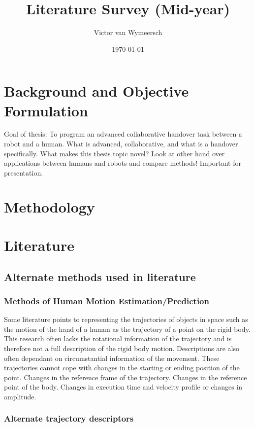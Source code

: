 \documentclass{article}
\title{Literature Survey (Mid-year)}
\author{Victor van Wymeersch}
\date{\today}
\begin{document}
\maketitle

 
\section{Background and Objective Formulation}
Goal of thesis: To program an advanced collaborative handover task between a robot and a human. 
What is advanced, collaborative, and what is a handover specifically. 
What makes this thesis topic novel? Look at other hand over applications between humans and robots and compare methods! Important for presentation.

\section{Methodology}
\section{Literature}

\subsection{Alternate methods used in literature}
\subsubsection{Methods of Human Motion Estimation/Prediction}
Some literature points to representing the trajectories of objects in space such as the motion of the hand of a human as the trajectory of a point on the rigid body. 
This research often lacks the rotational information of the trajectory and is therefore not a full description of the rigid body motion.
Descriptions are also often dependant on circumstantial information of the movement. These trajectories cannot cope with changes in the starting or ending position of the point. Changes in the reference frame of the trajectory. Changes in the reference point of the body. Changes in execution time and velocity profile or changes in amplitude. 



\subsubsection{Alternate trajectory descriptors}
\end{document}
